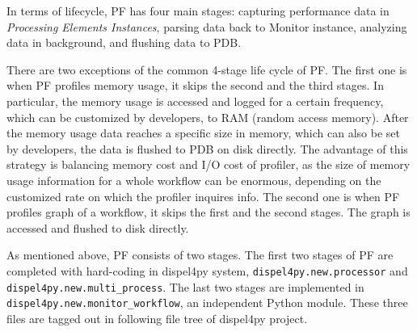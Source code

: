 \documentclass[10pt,twoside,openright,logo]{report}
\begin{document}
In terms of lifecycle, PF has four main stages:
capturing performance data in \textit{Processing Elements Instances},
parsing data back to Monitor instance,
analyzing data in background,
and flushing data to PDB.

There are two exceptions of the common 4-stage life cycle of PF. The first one is when PF profiles memory usage, it skips the second and the third stages. In particular, the memory usage is accessed and logged for a certain frequency, which can be customized by developers, to RAM (random access memory). After the memory usage data reaches a specific size in memory, which can also be set by developers, the data is flushed to PDB on disk directly. The advantage of this strategy is balancing memory cost and I/O cost of profiler, as the size of memory usage information for a whole workflow can be enormous, depending on the customized rate on which the profiler inquires info. The second one is when PF profiles graph of a workflow, it skips the first and the second stages. The graph is accessed and flushed to disk directly.

As mentioned above, PF consists of two stages. The first two stages of PF are completed with hard-coding in dispel4py system, \texttt{dispel4py.new.processor} and \texttt{dispel4py.new.multi_process}. The last two stages are implemented in \texttt{dispel4py.new.monitor_workflow}, an independent Python module. These three files are tagged out in following file tree of dispel4py project.
\end{document}
